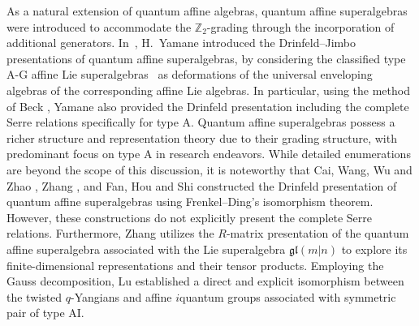 \documentclass[10pt,a4paper]{amsart}
\numberwithin{equation}{section}
\begin{document}
As a natural extension of quantum affine algebras, quantum affine superalgebras were introduced to accommodate the $\mathbb{Z}_2$-grading through the incorporation of additional generators.
In~\cite{HYAM}, H.~Yamane introduced the Drinfeld--Jimbo presentations of quantum affine superalgebras, by considering the classified type A-G affine Lie superalgebras~\cite{VGD3,VANDE} as deformations of the universal enveloping algebras of the corresponding affine Lie algebras. In particular, using the method of Beck \cite{JBECK}, Yamane also provided the Drinfeld presentation including the complete Serre relations specifically for type A.
Quantum affine superalgebras possess a richer structure and representation theory due to their grading structure, with predominant focus on type A in research endeavors. While detailed enumerations are beyond the scope of this discussion, it is noteworthy that Cai, Wang, Wu and Zhao \cite{JSKW}, Zhang \cite{YZC}, and Fan, Hou and Shi \cite{HBKD} constructed the Drinfeld presentation of quantum affine superalgebras  using Frenkel--Ding's isomorphism theorem. However, these constructions do not explicitly present the complete Serre relations. Furthermore,
Zhang \cite{Huafeng} utilizes the $R$-matrix presentation of the quantum affine superalgebra associated with the Lie superalgebra $\mathfrak{gl}(m|n)$ to explore its finite-dimensional representations and their tensor products. Employing the Gauss decomposition, Lu \cite{K-Lu} established a direct and explicit isomorphism between the twisted $q$-Yangians and affine $i$quantum groups associated with symmetric pair of type AI.
\end{document}
